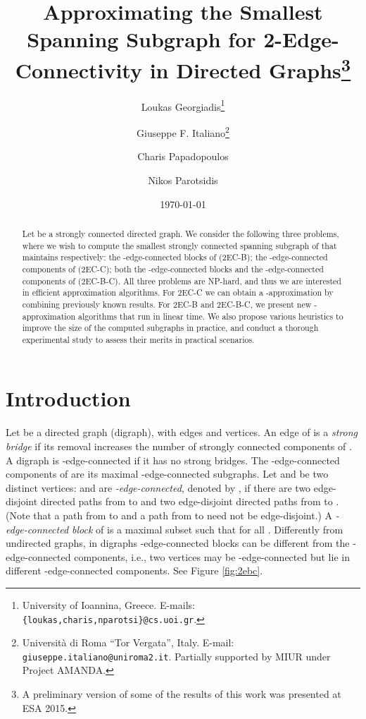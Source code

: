 \documentclass[11pt]{article}
\begin{document}
\title{\bf Approximating the Smallest Spanning Subgraph for 2-Edge-Connectivity in Directed Graphs\thanks{
A preliminary version of some of the results of this work was presented at ESA 2015.}}
\author{
Loukas Georgiadis\thanks{
University of Ioannina, Greece. E-mails: \texttt{\{loukas,charis,nparotsi\}@cs.uoi.gr}.}
\and
Giuseppe F. Italiano\thanks{
Universit\`a di Roma ``Tor Vergata'', Italy. E-mail: \texttt{giuseppe.italiano@uniroma2.it}.
Partially supported by MIUR
under Project AMANDA.
}
\and
Charis Papadopoulos
\and
Nikos Parotsidis
}

\date{\today}

\maketitle

\begin{abstract}
Let  be a strongly connected directed graph. We consider the following three problems, where we wish to compute the smallest strongly connected spanning subgraph of  that maintains respectively: the -edge-connected blocks of  (\textsf{2EC-B});
the -edge-connected components of  (\textsf{2EC-C});
both the -edge-connected blocks and the -edge-connected components of  (\textsf{2EC-B-C}). All three problems are NP-hard, and thus we are interested in efficient approximation algorithms.
For \textsf{2EC-C} we can obtain a -approximation by combining previously known results.
For \textsf{2EC-B} and \textsf{2EC-B-C}, we present new -approximation algorithms that run in linear time.
We also propose various heuristics to improve the size of the computed subgraphs in practice, and conduct a thorough experimental study to assess their merits in practical scenarios.
\end{abstract}

\section{Introduction}
\label{sec:introduction}

Let  be a directed graph (digraph), with  edges and  vertices.
An edge of  is a \emph{strong bridge} if its removal increases the number of strongly connected components of .
A digraph  is -edge-connected if it has no strong bridges. The -edge-connected components of  are its maximal -edge-connected subgraphs.
Let  and  be two distinct vertices:  and  are \emph{-edge-connected}, denoted by  , if there are two edge-disjoint directed paths from  to   and two edge-disjoint directed paths from  to . (Note that a path from  to  and a path from  to  need not be edge-disjoint.)
A \emph{-edge-connected block} of  is a maximal subset  such that  for all .
Differently from undirected graphs, in digraphs -edge-connected blocks can be different from the  -edge-connected components, i.e., two vertices may be -edge-connected but lie in different -edge-connected components. See Figure \ref{fig:2ebc}.
\end{document}
